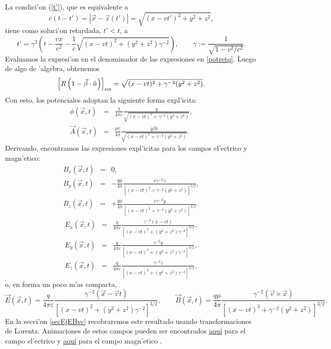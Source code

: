 La condici'on (\ref{t'}), que es equivalente a
\begin{equation}
c(t-t')=\left|\vec{x}-\vec{z}(t')\right|=\sqrt{(x-vt')^2+y^2+z^2},
\end{equation}
tiene como soluci'on retardada, $t'<t$, a
\begin{equation}
t'=\gamma^2\left( t-\frac{vx}{c^2}-\frac{1}{c}\sqrt{(x-vt)^2+
(y^2+z^2)\gamma^{-2}}\right) , \qquad \gamma:=\frac{1}{\sqrt{1-v^2/c^2}}.
\end{equation}
Evaluamos la expresi'on en el denominador de las expresiones en \eqref{potretq}. Luego de algo de 'algebra, obtenemos
\begin{equation}
\left[ R\left(1-\vec{\beta}\cdot\hat{n}\right)\right]_{\rm ret}=\sqrt{(x-vt)^2+  \gamma^{-2}(y^2+z^2)}.
\end{equation}
Con esto, los potenciales adoptan la siguiente forma expl'icita:
\begin{eqnarray}
\phi(\vec{x},t)&=&\frac{1}{4\pi\varepsilon}\frac{q}{\sqrt{(x-vt)^2+ \gamma^{-2}(y^2+z^2)}} ,\\
\vec{A}(\vec{x},t)&=&\frac{\mu c}{4\pi} \frac{q\beta\hat{x}}{\sqrt{(x-vt)^2+
\gamma^{-2}(y^2+z^2)}}.
\end{eqnarray}
Derivando, encontramos las expresiones expl'icitas para los campos el'ectrico y magn'etico:
\begin{eqnarray}
B_x(\vec{x},t)&=&0, \\
B_y(\vec{x},t)&=&-\frac{q\mu}{4\pi}\frac{v\gamma^{-2}z}{\left[ (x-vt)^2+
\gamma^{-2}(y^2+z^2)\right]^{3/2}}, \\
B_z(\vec{x},t)&=&+\frac{q\mu}{4\pi}\frac{v\gamma^{-2}y}{\left[(x-vt)^2+
\gamma^{-2}(y^2+z^2)\right]^{3/2}}.
\end{eqnarray}
\begin{eqnarray}
E_x(\vec{x},t)&=&\frac{q}{4\pi\varepsilon}\frac{\gamma^{-2}\left( x-vt\right) }{\left[ (x-vt)^2+
(y^2+z^2)\gamma^{-2}\right] ^{3/2}}, \\
E_y(\vec{x},t)&=&\frac{q}{4\pi\varepsilon}\frac{\gamma^{-2}y}{\left[ (x-vt)^2+
(y^2+z^2)\gamma^{-2}\right] ^{3/2}},\\
E_z(\vec{x},t)&=&\frac{q}{4\pi\varepsilon}\frac{\gamma^{-2}z }{\left[ (x-vt)^2+
(y^2+z^2)\gamma^{-2}\right]
^{3/2}},
\end{eqnarray}
o, en forma un poco m'as compacta,
\begin{equation}\label{EBqvconst}
\vec{E}(\vec{x},t)=\frac{q}{4\pi\varepsilon}\frac{\gamma^{-2}\left(\vec{x}-\vec{v}t\right)}{\left[(x-vt)^2+ (y^2+z^2)\gamma^{-2}\right] ^{3/2}},  \qquad
\vec{B}(\vec{x},t)=\frac{q\mu}{4\pi}\frac{\gamma^{-2}(\vec{v}\times\vec{x})}{\left[(x-vt)^2+\gamma^{-2}(y^2+z^2)\right]^{3/2}}.
\end{equation}
En la secci'on \ref{secEjEBvc} recobraremos este resultado usando transformaciones de Lorentz. Animaciones de estos campos pueden ser encontrados \href{http://ocw.mit.edu/ans7870/8/8.02T/f04/visualizations/electrostatics/04-MovingChargePosElec/04-MovChrgPosElec_f223_320.html}{aqu\'i} para el campo el'ectrico y \href{http://ocw.mit.edu/ans7870/8/8.02T/f04/visualizations/magnetostatics/01-MovingChargePosMag/01-MovChrgMagPos_f223_320.html}{aqu\'i} para el campo magn'etico \cite{MIT}.


